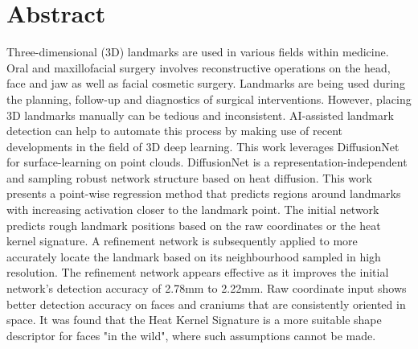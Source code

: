 \documentclass[class=article, crop=false]{standalone}
\begin{document}

\pagestyle{empty}


\section*{\centering Abstract}

Three-dimensional (3D) landmarks are used in various fields within medicine. Oral and maxillofacial surgery involves reconstructive operations on the head, face and jaw as well as facial cosmetic surgery. Landmarks are being used during the planning, follow-up and diagnostics of surgical interventions. However, placing 3D landmarks manually can be tedious and inconsistent. AI-assisted landmark detection can help to automate this process by making use of recent developments in the field of 3D deep learning.
This work leverages DiffusionNet for surface-learning on point clouds. DiffusionNet is a representation-independent and sampling robust network structure based on heat diffusion.
This work presents a point-wise regression method that predicts regions around landmarks with increasing activation closer to the landmark point. The initial network predicts rough landmark positions based on the raw coordinates or the heat kernel signature. A refinement network is subsequently applied to more accurately locate the landmark based on its neighbourhood sampled in high resolution. The refinement network appears effective as it improves the initial network's detection accuracy of 2.78mm to 2.22mm. Raw coordinate input shows better detection accuracy on faces and craniums that are consistently oriented in space. It was found that the Heat Kernel Signature is a more suitable shape descriptor for faces "in the wild", where such assumptions cannot be made.


\noindent
\clearpage
\end{document}
